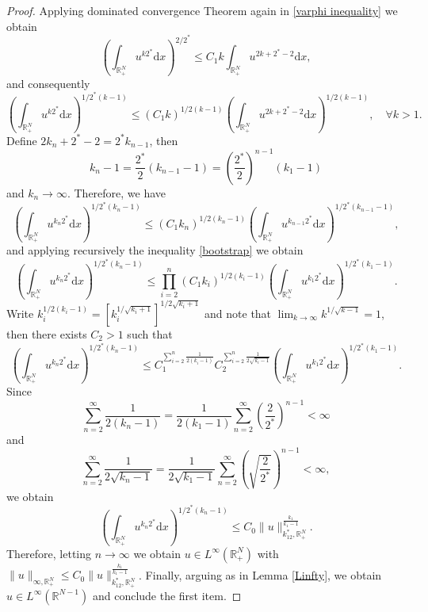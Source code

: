 \documentclass[10pt,a4paper]{amsart}
\begin{document}
\begin{proof}
Applying dominated convergence Theorem again in \eqref{varphi inequality} we obtain
\begin{equation*}
    \left(\int_{\mathds{R}^N_+}u^{k2^\ast}\mathrm{d}x\right)^{2/2^\ast}\leq C_1 k \int_{\mathds{R}^N_+}u^{2k+2^\ast-2}\mathrm{d}x,
\end{equation*}
and consequently
\begin{equation}\label{bootstrap}
    \left(\int_{\mathds{R}^N_+}u^{k2^\ast}\mathrm{d}x\right)^{1/2^\ast(k-1)}\leq (C_1k)^{1/2(k-1)} \left(\int_{\mathds{R}^N_+} u^{2k
    +2^\ast-2}\mathrm{d}x\right)^{1/2(k-1)},\quad \forall k>1.
\end{equation}
Define $2k_{n}+2^\ast-2=2^\ast k_{n-1}$, then
\begin{equation*}
k_n-1=\frac{2^\ast}{2}(k_{n-1}-1)=\left(\frac{2^\ast}{2}\right)^{n-1}(k_1-1)
\end{equation*}
and $k_n\longrightarrow \infty$. Therefore, we have
\begin{equation*}
    \left(\int_{\mathds{R}^N_+}u^{k_n2^\ast}\mathrm{d}x\right)^{1/2^\ast(k_n-1)}\leq (C_1k_n)^{1/2(k_n-1)} \left(\int_{\mathds{R}^N_+} u^{k_{n-1}2^\ast}\mathrm{d}x\right)^{1/2^\ast(k_{n-1}-1)},
\end{equation*}
and applying recursively the inequality \eqref{bootstrap} we obtain
\begin{equation*}
    \left(\int_{\mathds{R}^N_+}u^{k_n2^\ast}\mathrm{d}x\right)^{1/2^\ast(k_n-1)}\leq \prod_{i=2}^n(C_1k_i)^{1/2(k_i-1)} \left(\int_{\mathds{R}^N_+} u^{k_{1}2^\ast}\mathrm{d}x\right)^{1/2^\ast(k_{1}-1)}.
\end{equation*}
Write $k_i^{1/2(k_i-1)}=\left[k_i^{1/\sqrt{k_i+1}}\right]^{1/2\sqrt{k_i+1}}$ and note that $\displaystyle\lim_{k\longrightarrow \infty}k^{1/\sqrt{k-1}}=1$, then there exists $C_2>1$ such that
\begin{equation*}
  \left(\int_{\mathds{R}^N_+}u^{k_n2^\ast}\mathrm{d}x\right)^{1/2^\ast(k_n-1)}\leq C_1^{\sum_{i=2}^n{\frac{1}{2(k_i-1)}}} C_2^{\sum_{i=2}^n{\frac{1}{2\sqrt{k_i-1}}}} \left(\int_{\mathds{R}^N_+} u^{k_{1}2^\ast}\mathrm{d}x\right)^{1/2^\ast(k_{1}-1)}.
  \end{equation*}
Since
\begin{equation*}
    \sum_{n=2}^\infty \frac{1}{2(k_n-1)}=\frac{1}{2(k_1-1)} \sum_{n=2}^\infty \left(\frac{2}{ 2^\ast}\right)^{n-1}<\infty  
\end{equation*}
and
\begin{equation*}
    \sum_{n=2}^\infty \frac{1}{2\sqrt{k_n-1}}=\frac{1}{2\sqrt{k_1-1}}\sum_{n=2}^\infty \left(\sqrt{\frac{2}{ 2^\ast}}\right)^{n-1}<\infty,
\end{equation*}
we obtain
\begin{equation*}
    \left(\int_{\mathds{R}^N_+}u^{k_n2^\ast}\mathrm{d}x\right)^{1/2^\ast(k_n-1)}\leq C_0\|u\|_{k_12^\ast,\mathds{R}^N_+}^{\frac{k_1}{k_1-1}}.
\end{equation*}
Therefore, letting $n\longrightarrow \infty$ we obtain $u\in L^{\infty}(\mathds{R}^N_+)$ with $\|u\|_{\infty, \mathds{R}^N_+}\leq C_0 \|u\|_{k_12^\ast,\mathds{R}^N_+}^{\frac{k_1}{k_1-1}}$. Finally, arguing as in Lemma \ref{Linfty}, we obtain $u\in L^\infty(\mathds{R}^{N-1})$ and conclude the first item.


\end{proof}
\end{document}
